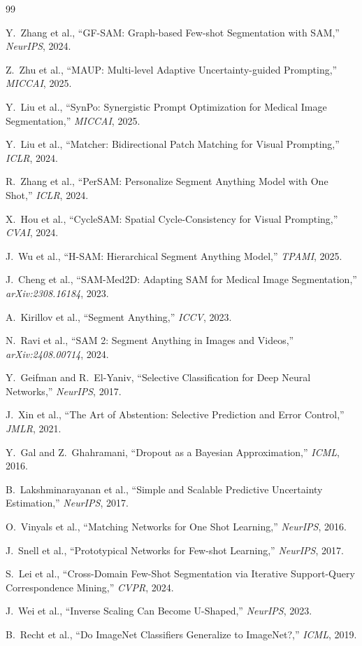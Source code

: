 \documentclass[11pt]{article}
\begin{document}
\begin{thebibliography}{99}

Y.~Zhang et al., ``GF-SAM: Graph-based Few-shot Segmentation with SAM,''
\emph{NeurIPS}, 2024.

Z.~Zhu et al., ``MAUP: Multi-level Adaptive Uncertainty-guided Prompting,''
\emph{MICCAI}, 2025.

Y.~Liu et al., ``SynPo: Synergistic Prompt Optimization for Medical Image
Segmentation,''
\emph{MICCAI}, 2025.

Y.~Liu et al., ``Matcher: Bidirectional Patch Matching for Visual
Prompting,''
\emph{ICLR}, 2024.

R.~Zhang et al., ``PerSAM: Personalize Segment Anything Model with One
Shot,''
\emph{ICLR}, 2024.

X.~Hou et al., ``CycleSAM: Spatial Cycle-Consistency for Visual
Prompting,''
\emph{CVAI}, 2024.

J.~Wu et al., ``H-SAM: Hierarchical Segment Anything Model,''
\emph{TPAMI}, 2025.

J.~Cheng et al., ``SAM-Med2D: Adapting SAM for Medical Image Segmentation,''
\emph{arXiv:2308.16184}, 2023.

A.~Kirillov et al., ``Segment Anything,''
\emph{ICCV}, 2023.

N.~Ravi et al., ``SAM 2: Segment Anything in Images and Videos,''
\emph{arXiv:2408.00714}, 2024.

Y.~Geifman and R.~El-Yaniv, ``Selective Classification for Deep Neural
Networks,''
\emph{NeurIPS}, 2017.

J.~Xin et al., ``The Art of Abstention: Selective Prediction and Error
Control,''
\emph{JMLR}, 2021.

Y.~Gal and Z.~Ghahramani, ``Dropout as a Bayesian Approximation,''
\emph{ICML}, 2016.

B.~Lakshminarayanan et al., ``Simple and Scalable Predictive Uncertainty
Estimation,''
\emph{NeurIPS}, 2017.

O.~Vinyals et al., ``Matching Networks for One Shot Learning,''
\emph{NeurIPS}, 2016.

J.~Snell et al., ``Prototypical Networks for Few-shot Learning,''
\emph{NeurIPS}, 2017.

S.~Lei et al., ``Cross-Domain Few-Shot Segmentation via Iterative
Support-Query Correspondence Mining,''
\emph{CVPR}, 2024.

J.~Wei et al., ``Inverse Scaling Can Become U-Shaped,''
\emph{NeurIPS}, 2023.

B.~Recht et al., ``Do ImageNet Classifiers Generalize to ImageNet?,''
\emph{ICML}, 2019.

\end{thebibliography}
\end{document}
